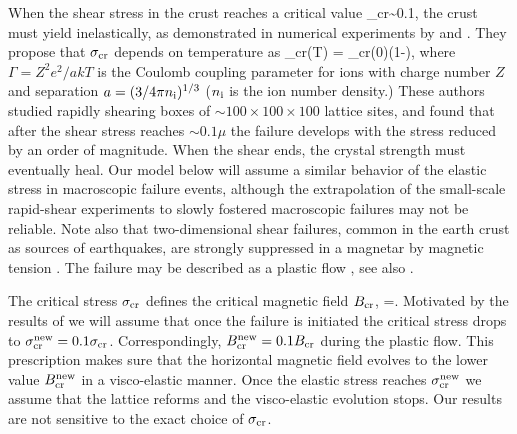When the shear stress in the crust reaches a critical value 
\beq
\sigma_{\rm cr}\sim 0.1\mu,
\eeq
the crust must yield inelastically, as demonstrated in numerical experiments by 
\citet{2009PhRvL.102s1102H} and 
\citet{2010MNRAS.407L..54C}.
They propose that $\sigma_{\rm cr}$ depends on temperature as
\beq\label{shearstress}
\sigma_{\rm cr}(T) = \sigma_{\rm cr}(0)\left(1-\right), 
\eeq
where $\Gamma=Z^2 e^2/akT$ is the Coulomb coupling parameter for ions with charge
number $Z$ and separation $a=(3/4\pi n_{\rm i})^{1/3}$ ($n_{\rm i}$ is the ion number density.)
These authors studied rapidly shearing boxes of $\sim 100\times100\times 100$ lattice sites, 
and found that after the shear stress reaches $\sim 0.1\mu$ the failure develops with the 
stress reduced by an order of magnitude.
When the shear ends, the crystal strength must eventually heal.
Our model below will assume a similar behavior of the elastic stress in macroscopic
failure events, although the extrapolation of the small-scale rapid-shear experiments 
to slowly fostered macroscopic failures may not be reliable.
Note also that two-dimensional shear failures, common in the earth crust as sources of 
earthquakes, are strongly suppressed in a magnetar by magnetic tension 
\citep{2012MNRAS.427.1574L}. The failure may be described as 
a plastic flow \citep{2014ApJ...794L..24B}, see also \citet{2003ApJ...595..342J}.

The critical stress $\sigma_{\rm cr}$ defines the critical magnetic field $B_{\rm cr}$,
\beq
  =\sigcr.
\eeq
Motivated by the results of \citet{2009PhRvL.102s1102H}
we will
assume that once the failure
is initiated the critical stress  drops
to $\sigma_{\rm cr}^{\rm new}=0.1\sigma_{\rm cr}$. 
Correspondingly, $B_{\rm cr}^{\rm new}=0.1B_{\rm cr}$ during the plastic flow.
This prescription makes sure that the horizontal magnetic field evolves to the lower value $B_{\rm cr}^{\rm new}$ in a visco-elastic manner. Once the elastic stress reaches $\sigma_{\rm cr}^{\rm new}$ we assume that the lattice reforms and the visco-elastic evolution stops.
Our results are not sensitive to the exact choice of $\sigma_{\rm cr}$.

